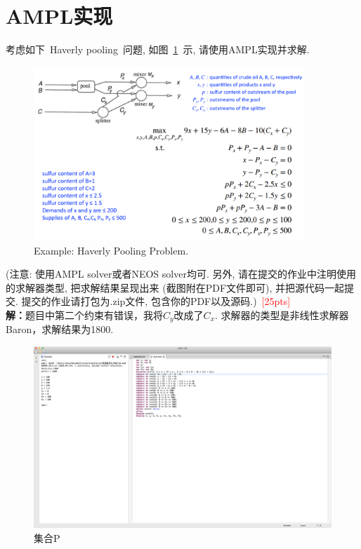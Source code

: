 \documentclass[10pt]{article}
\begin{document}
\section{AMPL实现}
考虑如下~Haverly pooling~问题, 如图~\ref{fig: Haverly}~示, 请使用AMPL实现并求解.
\begin{figure}[htbp]
	\centering
	\includegraphics[width=4in]{Haverly pooling.jpg}
	\caption{Example: Haverly Pooling Problem.}
	\label{fig: Haverly}
\end{figure}
(注意: 使用AMPL solver或者NEOS solver均可. 另外, 请在提交的作业中注明使用的求解器类型, 把求解结果呈现出来 (截图附在PDF文件即可), 并把源代码一起提交. 提交的作业请打包为.zip文件, 包含你的PDF以及源码.)~\textcolor{red}{[25pts]}\\
\textbf{解：}题目中第二个约束有错误，我将$C_y$改成了$C_x$. 求解器的类型是非线性求解器Baron，求解结果为1800.
\begin{figure}[!h]
	\centering
	\includegraphics[width=6in]{p4.png}
	\caption{集合P}
	\label{fig: linear program}
\end{figure}
\end{document}
